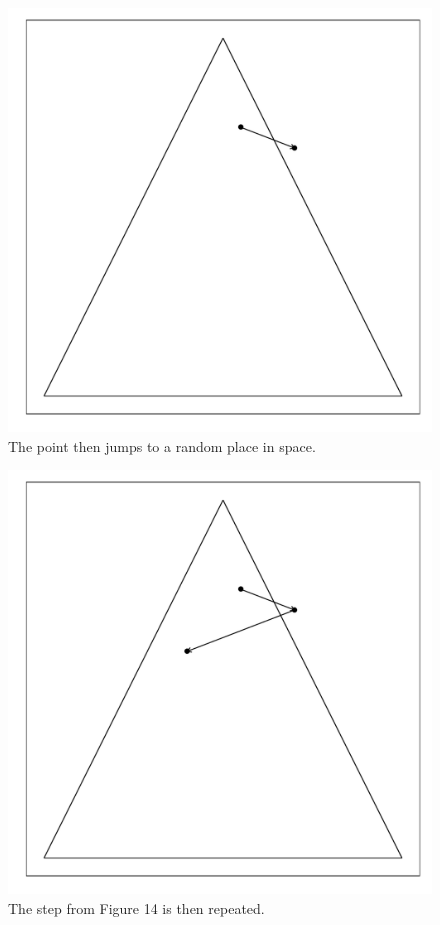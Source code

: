 \documentclass{article}\usepackage{graphicx, color}
\makeatletter
\def\maxwidth{ %
  \ifdim\Gin@nat@width>\linewidth
    \linewidth
  \else
    \Gin@nat@width
  \fi
}
\newenvironment{knitrout}{}{} %
\makeatother
\begin{document}
\begin{figure}[H]
\begin{knitrout}
\color{fgcolor}
\includegraphics[width=\maxwidth]{figure/mirror_walkthrough2} 

\end{knitrout}

\caption{The point then jumps to a random place in space.}
\end{figure}

\begin{figure}[H]
\begin{knitrout}
\color{fgcolor}
\includegraphics[width=\maxwidth]{figure/mirror_walkthrough3} 

\end{knitrout}

\caption{The step from Figure 14 is then repeated.}
\end{figure}
\end{document}
